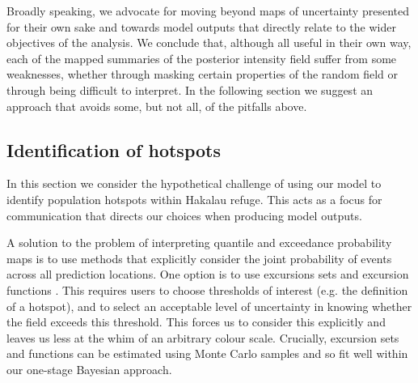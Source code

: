 \documentclass{statsoc}
\begin{document}
Broadly speaking, we advocate for moving beyond maps of uncertainty presented for their own sake and towards model outputs that directly relate to the wider objectives of the analysis. We conclude that, although all useful in their own way, each of the mapped summaries of the posterior intensity field suffer from some weaknesses, whether through masking certain properties of the random field or through being difficult to interpret. In the following section we suggest an approach that avoids some, but not all, of the pitfalls above.

\subsection{Identification of hotspots}

In this section we consider the hypothetical challenge of using our model to identify population hotspots within Hakalau refuge.  This acts as a focus for communication that directs our choices when producing model outputs.

A solution to the problem of interpreting quantile and exceedance probability maps is to use methods that explicitly consider the joint probability of events across all prediction locations. One option is to use excursions sets and excursion functions \citep{bolin_excursion_2015}.  This requires users to choose thresholds of interest (e.g. the definition of a hotspot), and to select an acceptable level of uncertainty in knowing whether the field exceeds this threshold.  This forces us to consider this explicitly and leaves us less at the whim of an arbitrary colour scale.  Crucially, excursion sets and functions can be estimated using Monte Carlo samples and so fit well within our one-stage Bayesian approach.
\end{document}
